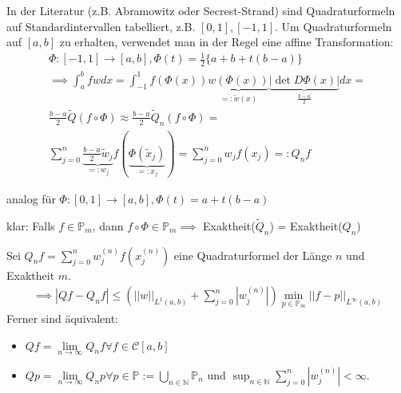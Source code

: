 \begin{remark}
	In der Literatur (z.B. Abramowitz oder Secrest-Strand) sind Quadraturformeln auf Standardintervallen tabelliert, z.B. $[0, 1], [-1, 1]$. Um Quadraturformeln auf $[a, b]$ zu erhalten, verwendet man in der Regel eine affine Transformation:
	\begin{align*}
		\Phi: [-1, 1] \rightarrow [a, b], \Phi(t) = \frac{1}{2} \{a + b + t(b-a)\}\\
		\implies \int_{a}^{b} fw dx = \int_{-1}^{1} f(\Phi(x)) \underbrace{w(\Phi(x))}_{=: \tilde{w}(x)} \underbrace{|\det D\Phi(x)|}_{\frac{b-a}{2}} dx =\\
		\frac{b-a}{2} \tilde{Q}(f \circ \Phi) \approx
		\frac{b-a}{2} \tilde{Q}_n(f\circ \Phi) =\\
		\sum_{j=0}^{n} \underbrace{\frac{b-a}{2} \tilde{w}_j}_{=: w_j} f(\underbrace{\Phi(\tilde{x}_j)}_{=: x_j}) =
		\sum_{j=0}^{n} w_j f(x_j) =:
		Q_n f
	\end{align*}
	
	analog für $\Phi: [0, 1] \rightarrow [a, b], \Phi(t) = a + t(b-a)$
	
	klar: Falls $f \in \mathbb{P}_m$, dann $f \circ \Phi \in \mathbb{P}_m \implies$ Exaktheit($\tilde{Q}_n$) = Exaktheit($Q_n$)
\end{remark}

\begin{theorem}
	Sei $Q_nf = \sum_{j=0}^{n} w_j^{(n)} f(x_j^{(n)})$ eine Quadraturformel der Länge $n$ und Exaktheit $m$.
	\begin{align*}
		\implies |Qf - Q_nf| \leq (||w||_{L^1(a,b)} + \sum_{j=0}^{n}|w_j^{(n)}|) \min_{p \in \mathbb{P}_m} ||f-p||_{L^\infty(a,b)}
	\end{align*}
	Ferner sind äquivalent:
	\begin{itemize}
		\item $Qf = \lim\limits_{n\rightarrow\infty} Q_n f \forall f \in \mathcal{C}[a,b]$
		\item $Qp = \lim\limits_{n\rightarrow\infty} Q_n p \forall p \in \mathbb{P} := \bigcup_{n\in\mathbb{N}} \mathbb{P}_n$ und $\sup_{n\in\mathbb{N}} \sum_{j=0}^{n} |w_j^{(n)}| < \infty$.
	\end{itemize}
\end{theorem}

